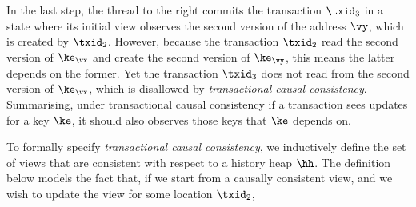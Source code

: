 
In the last step, the thread to the right commits the transaction $\txid_3$ in a state where its initial view observes the second version of the address $\vy$, which is created by \( \txid_{2} \).
However, because the transaction \( \txid_{2} \) read the second version of \( \ke_\vx \) and create the second version of \( \ke_\vy \), this means the latter depends on the former.
Yet the transaction \( \txid_{3} \) does not read from the second version of \( \ke_\vx \), which is disallowed by \emph{transactional causal consistency}.
Summarising, under transactional causal consistency if a transaction sees updates for a key \( \ke \), it should also observes those keys that \( \ke \) depends on.


To formally specify \emph{transactional causal consistency}, we inductively define the set of views that are consistent with respect to a history heap $\hh$. 
The definition below models the fact that, if we start from a causally consistent view, and we wish to update the view for some location $\txid_2$, 

